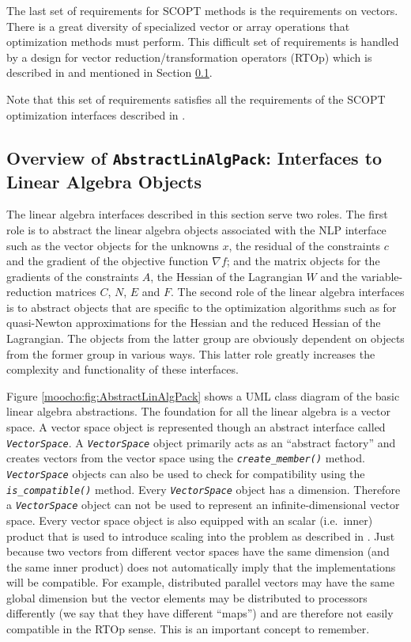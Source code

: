 \documentclass[pdf,12pt,report]{SANDreport}
\begin{document}
The last set of requirements for SCOPT methods is the requirements on
vectors.  There is a great diversity of specialized vector or array
operations that optimization methods must perform.  This difficult set
of requirements is handled by a design for vector
reduction/transformation operators (RTOp) which is described in
{}\cite{ref:rtop_toms} and mentioned in Section
{}\ref{moocho:sec:ALAP_overview}.

Note that this set of requirements satisfies all the requirements of the SCOPT
optimization interfaces described in {}\cite{ref:opt_ctrl_itfc}.

%
\subsection{Overview of {}\texttt{AbstractLinAlgPack}: Interfaces to Linear Algebra Objects}
\label{moocho:sec:ALAP_overview}
%

The linear algebra interfaces described in this section serve two roles.  The
first role is to abstract the linear algebra objects associated with the NLP
interface such as the vector objects for the unknowns $x$, the residual of the
constraints $c$ and the gradient of the objective function $\nabla f$; and the
matrix objects for the gradients of the constraints $A$, the Hessian of the
Lagrangian $W$ and the variable-reduction matrices $C$, $N$, $E$ and $F$.  The
second role of the linear algebra interfaces is to abstract objects that are
specific to the optimization algorithms such as for quasi-Newton
approximations for the Hessian and the reduced Hessian of the Lagrangian.  The
objects from the latter group are obviously dependent on objects from the
former group in various ways.  This latter role greatly increases the
complexity and functionality of these interfaces.

Figure {}\ref{moocho:fig:AbstractLinAlgPack} shows a UML class diagram of the
basic linear algebra abstractions.  The foundation for all the linear algebra
is a vector space.  A vector space object is represented though an abstract
interface called {}\texttt{\textit{VectorSpace}}.  A
{}\texttt{\textit{VectorSpace}} object primarily acts as an ``abstract
factory'' {}\cite{ref:gama_et_al_1995} and creates vectors from the vector
space using the {}\texttt{\textit{create\_member()}} method.
{}\texttt{\textit{Vector\-Space}} objects can also be used to check for
compatibility using the {}\texttt{\textit{is\_compatible()}} method.  Every
{}\texttt{\textit{Vector\-Space}} object has a dimension.  Therefore a
{}\texttt{\textit{Vector\-Space}} object can not be used to represent an
infinite-dimensional vector space.  Every vector space object is also equipped
with an scalar (i.e.\ inner) product that is used to introduce scaling into
the problem as described in {}\cite{ref:opt_ctrl_itfc}.  Just because two
vectors from different vector spaces have the same dimension (and the same
inner product) does not automatically imply that the implementations will be
compatible.  For example, distributed parallel vectors may have the same
global dimension but the vector elements may be distributed to processors
differently (we say that they have different ``maps'') and are therefore not
easily compatible in the RTOp sense.  This is an important concept to
remember.
\end{document}

